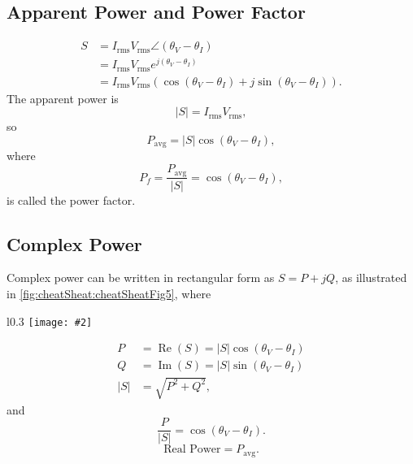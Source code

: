 \documentclass[letterpaper]{scrartcl}
\newcommand{\sideFigure}[5][l]{%
  \begin{wrapfigure}{#1}{#5\textwidth}%
    \centering%
    \texttt{[image: \#2]}%
    \caption{#3}%
    \label{#4}%
  \end{wrapfigure}%
}
\newcommand{\figspace}{\vspace{1.5\baselineskip}}
\newcommand{\lr}[1]{\left(#1\right)}
\DeclareMathOperator{\Real}{Re}
\DeclareMathOperator{\Imag}{Im}
\newcommand{\Avg}[0]{\mathrm{avg}}
\newcommand{\rms}[0]{\mathrm{rms}}
\newcommand{\Abs}[1]{{\left\lvert{#1}\right\rvert}}
\begin{document}
\subsection*{Apparent Power and Power Factor}
\begin{equation}\label{eqn:karlCircuitsCheatSheet:680}
\begin{aligned}
S
&= I_\rms V_\rms \angle \lr{\theta_V - \theta_I} \\
&= I_\rms V_\rms e^{j \lr{\theta_V - \theta_I}} \\
&= I_\rms V_\rms \lr{ \cos \lr{\theta_V - \theta_I} +j \sin \lr{\theta_V - \theta_I} }.
\end{aligned}
\end{equation}
The apparent power is
\begin{equation}\label{eqn:karlCircuitsCheatSheet:700}
\Abs{S} = I_\rms V_\rms,
\end{equation}
so
\begin{equation}\label{eqn:karlCircuitsCheatSheet:720}
P_\Avg = \Abs{S} \cos \lr{\theta_V - \theta_I},
\end{equation}
where
\begin{equation}\label{eqn:karlCircuitsCheatSheet:740}
P_f = \frac{P_\Avg}{\Abs{S}} = \cos \lr{\theta_V - \theta_I},
\end{equation}
is called the power factor.

\subsection*{Complex Power}
\begin{minipage}{\textwidth}
Complex power can be written in rectangular form as \( S = P + j Q \), as illustrated in \cref{fig:cheatSheat:cheatSheatFig5}, where
\end{minipage}
\sideFigure{../figures/blogit/cheatSheatFig5}{Power Triangle}{fig:cheatSheat:cheatSheatFig5}{0.3}
\figspace
\begin{equation}\label{eqn:karlCircuitsCheatSheet:820}
\begin{aligned}
P       &= \Real(S) = \Abs{S} \cos\lr{ \theta_V - \theta_I } \\
Q       &= \Imag(S) = \Abs{S} \sin\lr{ \theta_V - \theta_I } \\
\Abs{S} &= \sqrt{ P^2 + Q^2 },
\end{aligned}
\end{equation}
and
\begin{equation}\label{eqn:karlCircuitsCheatSheet:800}
\frac{P}{\Abs{S}} = \cos\lr{ \theta_V - \theta_I }.
\end{equation}
\begin{equation}\label{eqn:karlCircuitsCheatSheet:840}
\boxed{\textrm{Real Power} = P_\Avg}.
\end{equation}
\end{document}
